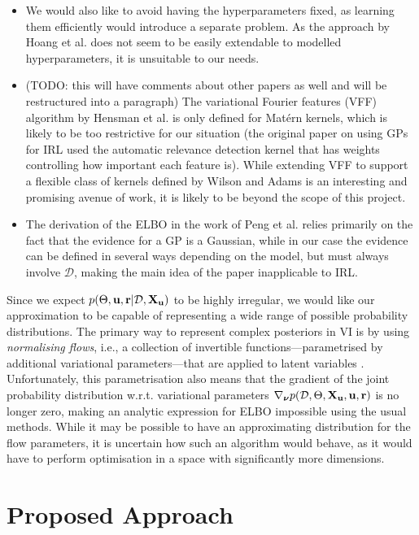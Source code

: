 \documentclass{mprop}
\theoremstyle{definition}
\begin{document}
\begin{itemize}
\item We would also like to avoid having the hyperparameters fixed, as learning
  them efficiently would introduce a separate problem. As the approach by Hoang
  et al. does not seem to be easily extendable to modelled hyperparameters, it
  is unsuitable to our needs.
\item (TODO: this will have comments about other papers as well and will be
  restructured into a paragraph) The variational Fourier features (VFF)
  algorithm by Hensman et al. \cite{DBLP:journals/jmlr/HensmanDS17} is only
  defined for Mat\'ern kernels, which is likely to be too restrictive for our
  situation (the original paper on using GPs for IRL
  \cite{DBLP:conf/nips/LevinePK11} used the automatic relevance detection kernel
  that has weights controlling how important each feature is). While extending
  VFF to support a flexible class of kernels defined by Wilson and Adams
  \cite{pmlr-v28-wilson13} is an interesting and promising avenue of work, it is
  likely to be beyond the scope of this project.
\item The derivation of the ELBO in the work of Peng et al.
  \cite{DBLP:conf/icml/PengZZQ17} relies primarily on the fact that the evidence
  for a GP is a Gaussian, while in our case the evidence can be defined in
  several ways depending on the model, but must always involve $\mathcal{D}$,
  making the main idea of the paper inapplicable to IRL.
\end{itemize}

Since we expect $p(\Theta, \mathbf{u}, \mathbf{r} | \mathcal{D}, \mathbf{X_u})$ to be highly irregular, we would like our
approximation to be capable of representing a wide range of possible probability
distributions. The primary way to represent complex posteriors in VI is by using
\emph{normalising flows}, i.e., a collection of invertible
functions---parametrised by additional variational parameters---that are applied
to latent variables \cite{DBLP:conf/icml/RezendeM15}. Unfortunately, this
parametrisation also means that the gradient of the joint probability
distribution w.r.t. variational parameters $\nabla_{\bm\nu}p(\mathcal{D}, \Theta, \mathbf{X_u}, \mathbf{u}, \mathbf{r})$ is no
longer zero, making an analytic expression for ELBO impossible using the usual
methods. While it may be possible to have an approximating distribution for the
flow parameters, it is uncertain how such an algorithm would behave, as it
would have to perform optimisation in a space with significantly more dimensions.

\section{Proposed Approach} \label{sec:proposed_approach}
\end{document}

